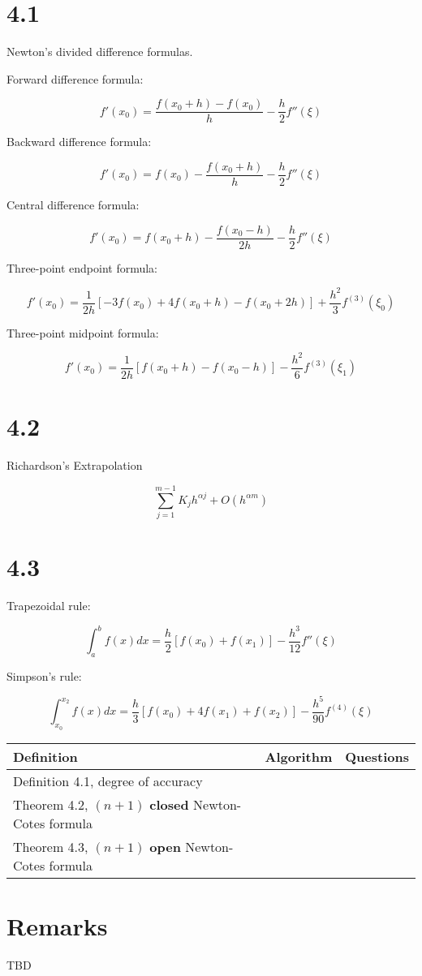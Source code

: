 \documentclass{article}
\begin{document}
\section*{4.1}

Newton's divided difference formulas.

Forward difference formula:

$$f'(x_0)=\frac{f(x_0+h) - f(x_0)}{h} - \frac{h}{2}f''(\xi)$$

Backward difference formula:

$$f'(x_0)=f(x_0) - \frac{f(x_0+h)}{h} - \frac{h}{2}f''(\xi)$$

Central difference formula:

$$f'(x_0)=f(x_0 + h) - \frac{f(x_0-h)}{2h} - \frac{h}{2}f''(\xi)$$

Three-point endpoint formula:

$$f'(x_0)=\frac{1}{2h}[-3f(x_0)+4f(x_0+h)-f(x_0+2h)]+\frac{h^2}{3}f^{(3)}(\xi_0)$$

Three-point midpoint formula:

$$f'(x_0)=\frac{1}{2h}[f(x_0+h)-f(x_0-h)]-\frac{h^2}{6}f^{(3)}(\xi_1)$$

\section*{4.2}

Richardson's Extrapolation

$$\sum_{j=1}^{m-1} K_j h^{\alpha j} + O(h^{\alpha m})$$

\section*{4.3}

Trapezoidal rule:

$$\int_a^b f(x)dx=\frac{h}{2}[f(x_0)+f(x_1)] - \frac{h^3}{12} f''(\xi)$$

Simpson's rule:

$$\int_{x_0}^{x_2} f(x)dx= \frac{h}{3}[f(x_0) + 4f(x_1)+f(x_2)]- \frac{h^5}{90}f^{(4)}(\xi)$$

\begin{tabularx}{\textwidth}{ |X|c|c| }
    \hline
	{\bf Definition} & {\bf Algorithm} & {\bf Questions} \\
    \hline
	Definition 4.1, degree of accuracy & & \\
    \hline
	Theorem 4.2, $(n+1)$ \textbf{closed} Newton-Cotes formula & & \\
    \hline
	Theorem 4.3, $(n+1)$ \textbf{open} Newton-Cotes formula & & \\
    \hline
\end{tabularx}

\section*{Remarks}

TBD
\end{document}
